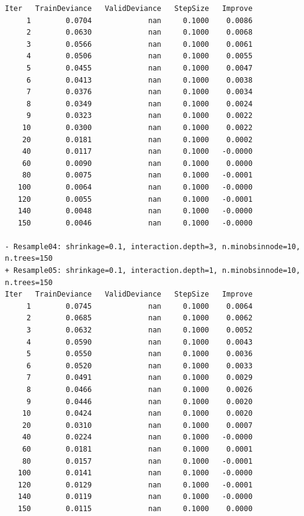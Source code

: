 \documentclass[
  letterpaper,
  DIV=11,
  numbers=noendperiod]{scrartcl}
\begin{document}
\begin{verbatim}
Iter   TrainDeviance   ValidDeviance   StepSize   Improve
     1        0.0704             nan     0.1000    0.0086
     2        0.0630             nan     0.1000    0.0068
     3        0.0566             nan     0.1000    0.0061
     4        0.0506             nan     0.1000    0.0055
     5        0.0455             nan     0.1000    0.0047
     6        0.0413             nan     0.1000    0.0038
     7        0.0376             nan     0.1000    0.0034
     8        0.0349             nan     0.1000    0.0024
     9        0.0323             nan     0.1000    0.0022
    10        0.0300             nan     0.1000    0.0022
    20        0.0181             nan     0.1000    0.0002
    40        0.0117             nan     0.1000   -0.0000
    60        0.0090             nan     0.1000    0.0000
    80        0.0075             nan     0.1000   -0.0001
   100        0.0064             nan     0.1000   -0.0000
   120        0.0055             nan     0.1000   -0.0001
   140        0.0048             nan     0.1000   -0.0000
   150        0.0046             nan     0.1000   -0.0000

- Resample04: shrinkage=0.1, interaction.depth=3, n.minobsinnode=10, n.trees=150 
+ Resample05: shrinkage=0.1, interaction.depth=1, n.minobsinnode=10, n.trees=150 
Iter   TrainDeviance   ValidDeviance   StepSize   Improve
     1        0.0745             nan     0.1000    0.0064
     2        0.0685             nan     0.1000    0.0062
     3        0.0632             nan     0.1000    0.0052
     4        0.0590             nan     0.1000    0.0043
     5        0.0550             nan     0.1000    0.0036
     6        0.0520             nan     0.1000    0.0033
     7        0.0491             nan     0.1000    0.0029
     8        0.0466             nan     0.1000    0.0026
     9        0.0446             nan     0.1000    0.0020
    10        0.0424             nan     0.1000    0.0020
    20        0.0310             nan     0.1000    0.0007
    40        0.0224             nan     0.1000   -0.0000
    60        0.0181             nan     0.1000    0.0001
    80        0.0157             nan     0.1000   -0.0001
   100        0.0141             nan     0.1000   -0.0000
   120        0.0129             nan     0.1000   -0.0001
   140        0.0119             nan     0.1000   -0.0000
   150        0.0115             nan     0.1000    0.0000


\end{verbatim}
\end{document}
